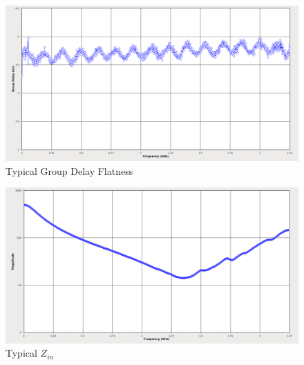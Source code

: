 \documentclass[11pt]{article}
\begin{document}
\begin{figure}[h]
\centering
\includegraphics[width=15cm]{typical-groupdelay.png}
\caption{Typical Group Delay Flatness}
\label{typical-groupdelay}
\end{figure}

\begin{figure}[h]
\centering
\includegraphics[width=15cm]{typical-zin.png}
\caption{Typical $Z_{in}$}
\label{typical-zin}
\end{figure}
\end{document}
